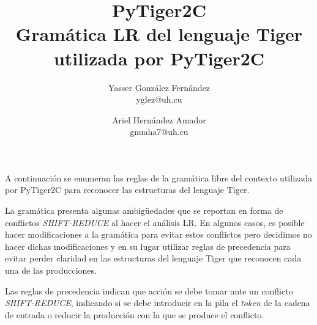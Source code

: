 \documentclass{article}
\title{
	\LARGE{PyTiger2C} \\
	\Large{Gramática LR del lenguaje Tiger utilizada por PyTiger2C}
}
\author{
  	Yasser González Fernández \\
  	\small{yglez@uh.cu}
  	\and
  	Ariel Hernández Amador \\
  	\small{gnuaha7@uh.cu}
}
\date{}
\begin{document}
\maketitle

\thispagestyle{empty}

\newpage

\setcounter{page}{1}

A continuación se enumeran las reglas de la gramática libre del contexto
utilizada por PyTiger2C para reconocer las estructuras del lenguaje Tiger.

La gramática presenta algunas ambigüedades que se reportan en forma de 
conflictos \emph{SHIFT-REDUCE} al hacer el análisis LR. En algunos casos, 
es posible hacer modificaciones a la gramática para evitar estos conflictos 
pero decidimos no hacer dichas modificaciones y en su lugar utilizar reglas 
de precedencia para evitar perder claridad en las estructuras del lenguaje 
Tiger que reconocen cada una de las producciones.

Las reglas de precedencia indican que acción se debe tomar ante un conflicto 
\emph{SHIFT-REDUCE}, indicando si se debe introducir en la pila el 
\emph{token} de la cadena de entrada o reducir la producción con la que 
se produce el conflicto.
\end{document}
